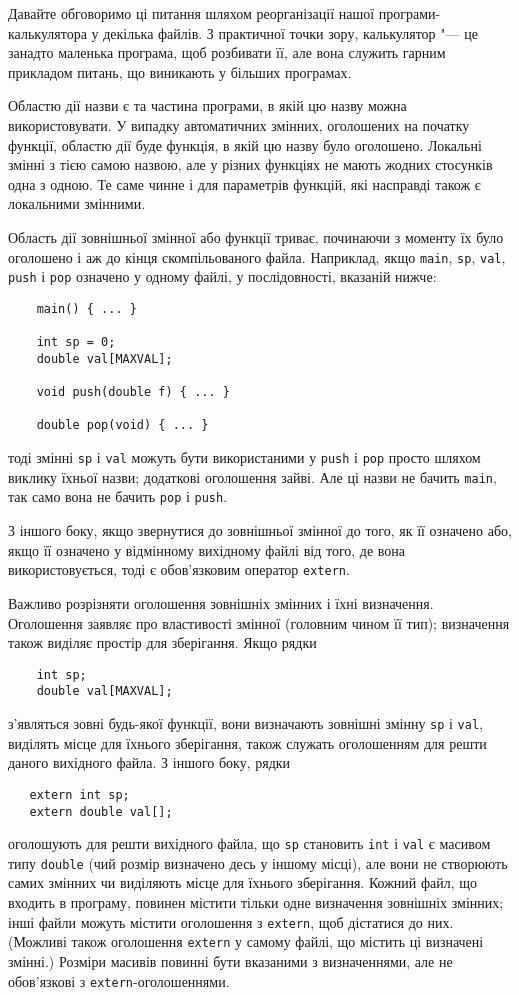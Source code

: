 \documentclass[a4paper,12pt]{book}
\begin{document}
  Давайте обговоримо ці питання шляхом реорганізації нашої програми-калькулятора у
  декілька файлів. З практичної точки зору, калькулятор "--- це занадто маленька
  програма, щоб розбивати її, але вона служить гарним прикладом питань, що виникають у
  більших програмах.

  Областю дії назви є та частина програми, в якій цю назву можна використовувати. У
  випадку автоматичних змінних, оголошених на початку функції, областю дії буде
  функція, в якій цю назву було оголошено. Локальні змінні з тією самою назвою, але у
  різних функціях не мають жодних стосунків одна з одною. Те саме чинне і для параметрів
  функцій, які насправді також є локальними змінними.

  Область дії зовнішньої змінної або функції триває, починаючи з моменту їх було оголошено
  і аж до кінця скомпільованого файла. Наприклад, якщо \texttt{main}, \texttt{sp},
  \texttt{val}, \texttt{push} і \texttt{pop} означено у одному файлі, у послідовності,
  вказаній нижче:
  \begin{verbatim}
    main() { ... }

    int sp = 0;
    double val[MAXVAL];

    void push(double f) { ... }

    double pop(void) { ... }
  \end{verbatim}
  тоді змінні \texttt{sp} і \texttt{val} можуть бути використаними у \texttt{push} і
  \texttt{pop} просто шляхом виклику їхньої назви; додаткові оголошення зайві. Але ці
  назви не бачить \texttt{main}, так само вона не бачить \texttt{pop} і \texttt{push}.

  З іншого боку, якщо звернутися до зовнішньої змінної до того, як її означено або,
  якщо її означено у відмінному вихідному файлі від того, де вона використовується, тоді
  є обов'язковим оператор
  \texttt{extern}.

  Важливо розрізняти оголошення зовнішніх змінних і їхні визначення. Оголошення
  заявляє про властивості змінної (головним чином її тип); визначення також виділяє
  простір для зберігання. Якщо рядки
  \begin{verbatim}
    int sp;
    double val[MAXVAL];
  \end{verbatim}
  з'являться зовні будь-якої функції, вони визначають зовнішні змінну \texttt{sp} і
  \texttt{val}, виділять місце для їхнього зберігання, також служать оголошенням для решти
  даного вихідного файла. З іншого боку, рядки
      \begin{verbatim}
   extern int sp;
   extern double val[];
  \end{verbatim}
  оголошують для решти вихідного файла, що \texttt{sp} становить \texttt{int} і
  \texttt{val} є масивом типу \texttt{double} (чий розмір визначено десь у іншому місці),
  але вони не створюють самих змінних чи виділяють місце для їхнього зберігання. Кожний
  файл, що входить в програму, повинен містити тільки одне визначення зовнішніх змінних;
  інші файли можуть містити оголошення з \texttt{extern}, щоб дістатися до них. (Можливі
  також оголошення \texttt{extern} у самому файлі, що містить ці визначені змінні.)
  Розміри масивів повинні бути вказаними з визначеннями, але не обов'язкові з
  \texttt{extern}-оголошеннями.
\end{document}
